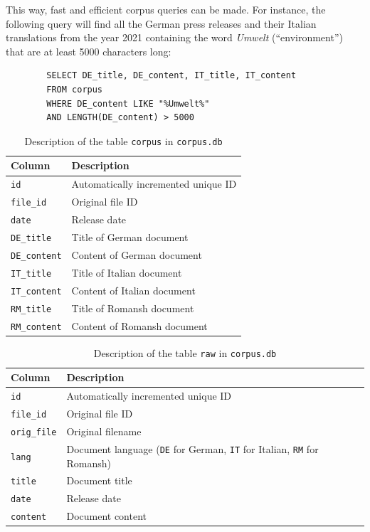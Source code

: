 This way, fast and efficient corpus queries can be made. For instance, the following query will find all the German press releases and their Italian translations from the year 2021 containing the word \emph{Umwelt} (\enquote{environment}) that are at least 5000 characters long:

\begin{verbatim}
		SELECT DE_title, DE_content, IT_title, IT_content 
		FROM corpus 
		WHERE DE_content LIKE "%Umwelt%"
		AND LENGTH(DE_content) > 5000
\end{verbatim}



\begin{table}
\centering
\begin{tabular}{lp{7cm}}
\toprule
Column & Description \\
\midrule
	\texttt{id} & Automatically incremented unique ID \\
	\texttt{file\_id} & Original file ID \\
	\texttt{date}&  Release date \\
	\texttt{DE\_title} &  Title of German document \\
	\texttt{DE\_content} &  Content of German document \\
	\texttt{IT\_title} &  Title of Italian document \\
	\texttt{IT\_content} &  Content of Italian document \\
	\texttt{RM\_title} &  Title of Romansh document \\
	\texttt{RM\_content} &  Content of Romansh document \\
\bottomrule
\end{tabular}
\caption{Description of the table \texttt{corpus} in \texttt{corpus.db}}
\label{tab:corpus.db-corpus}
\end{table}


\begin{table}
\centering
\begin{tabular}{l p{7cm}}
\toprule
Column & Description \\
\midrule
		\texttt{id} & Automatically incremented unique ID \\
		\texttt{file\_id} &  Original file ID \\
		\texttt{orig\_file} & Original filename \\
		\texttt{lang} &  Document language (\texttt{DE} for German, \texttt{IT} for Italian, \texttt{RM} for Romansh) \\
		\texttt{title} &  Document title \\
		\texttt{date} & Release date \\
		\texttt{content} &  Document content \\
\bottomrule
\end{tabular}
\caption{Description of the table \texttt{raw} in \texttt{corpus.db}}
\label{tab:corpus.db-raw}
\end{table}

